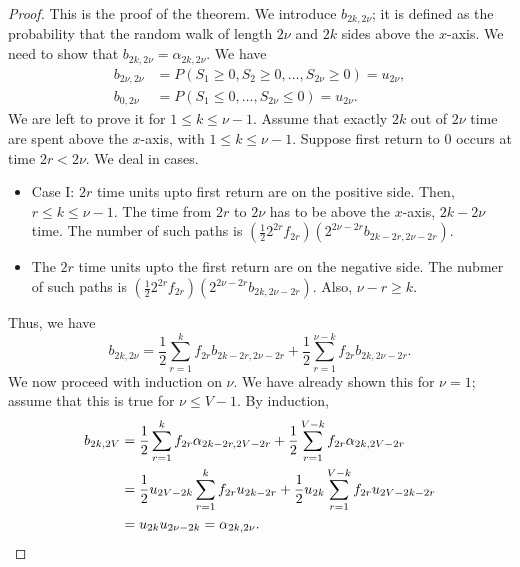 \documentclass[15pt,a4paper]{book}
\theoremstyle{definition}
\begin{document}
\begin{proof}
    This is the proof of the theorem. We introduce $b_{2k,2\nu}$; it is defined as the probability that the random walk of length $2\nu$ and $2k$ sides above the $x$-axis. We need to show that $b_{2k,2\nu} = \alpha_{2k,2\nu}$. We have
    \begin{align}
        b_{2\nu,2\nu} &= P(S_{1} \geq 0, S_{2} \geq 0, \ldots, S_{2\nu} \geq 0) = u_{2\nu}, \\
        b_{0,2\nu} &= P(S_{1} \leq 0, \ldots, S_{2\nu} \leq 0) = u_{2\nu}.
    \end{align}
    We are left to prove it for $1 \leq k \leq \nu-1$. Assume that exactly $2k$ out of $2\nu$ time are spent above the $x$-axis, with $1 \leq k \leq \nu-1$. Suppose first return to 0 occurs at time $2r < 2\nu$. We deal in cases.
    \begin{itemize}
        \item Case I: $2r$ time units upto first return are on the positive side. Then, $r \leq k \leq \nu-1$. The time from $2r$ to $2\nu$ has to be above the $x$-axis, $2k-2\nu$ time. The number of such paths is $(\frac{1}{2}2^{2r}f_{2r}) (2^{2\nu-2r} b_{2k-2r,2\nu-2r})$.
        \item The $2r$ time units upto the first return are on the negative side. The nubmer of such paths is $(\frac{1}{2}2^{2r}f_{2r})(2^{2\nu-2r}b_{2k,2\nu-2r})$. Also, $\nu-r \geq k$.
    \end{itemize}
    Thus, we have
    \begin{equation}
        b_{2k,2\nu} = \frac{1}{2}\sum_{r=1}^{k} f_{2r} b_{2k-2r,2\nu-2r} + \frac{1}{2} \sum_{r=1}^{\nu-k} f_{2r} b_{2k,2\nu-2r}.
    \end{equation}
    We now proceed with induction on $\nu$. We have already shown this for $\nu = 1$; assume that this is true for $\nu \leq V - 1$. By induction,
    \begin{align}
        b_{2k,2V} &= \frac{1}{2}\sum_{r=1}^{k} f_{2r} \alpha_{2k-2r,2V-2r} + \frac{1}{2} \sum_{r=1}^{V - k} f_{2r} \alpha_{2k,2V-2r} \notag \\
        &= \frac{1}{2} u_{2V-2k} \sum_{r=1}^{k} f_{2r} u_{2k-2r} + \frac{1}{2} u_{2k} \sum_{r=1}^{V-k} f_{2r} u_{2V-2k-2r} \notag \\
        &= u_{2k}u_{2\nu-2k} = \alpha_{2k,2\nu}.
    \end{align}
\end{proof}



\end{document}
